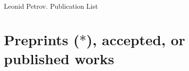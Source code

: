 \documentclass[letterpaper,11pt]{article}
\begin{document}
{\huge Leonid Petrov. Publication List}


\bigskip
\bigskip

%


\section*{Preprints ($*$), accepted, or published works}
\end{document}
